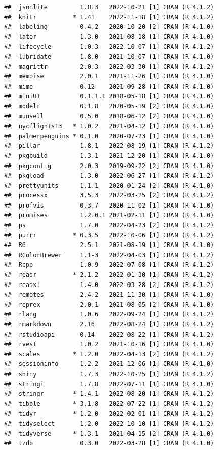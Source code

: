\documentclass[print]{nuthesis}
\begin{document}
\begin{verbatim}
##  jsonlite         1.8.3   2022-10-21 [1] CRAN (R 4.1.2)
##  knitr          * 1.41    2022-11-18 [1] CRAN (R 4.1.2)
##  labeling         0.4.2   2020-10-20 [2] CRAN (R 4.1.0)
##  later            1.3.0   2021-08-18 [1] CRAN (R 4.1.0)
##  lifecycle        1.0.3   2022-10-07 [1] CRAN (R 4.1.2)
##  lubridate        1.8.0   2021-10-07 [1] CRAN (R 4.1.0)
##  magrittr         2.0.3   2022-03-30 [1] CRAN (R 4.1.2)
##  memoise          2.0.1   2021-11-26 [1] CRAN (R 4.1.0)
##  mime             0.12    2021-09-28 [1] CRAN (R 4.1.0)
##  miniUI           0.1.1.1 2018-05-18 [1] CRAN (R 4.1.0)
##  modelr           0.1.8   2020-05-19 [2] CRAN (R 4.1.0)
##  munsell          0.5.0   2018-06-12 [2] CRAN (R 4.1.0)
##  nycflights13   * 1.0.2   2021-04-12 [1] CRAN (R 4.1.0)
##  palmerpenguins * 0.1.0   2020-07-23 [1] CRAN (R 4.1.0)
##  pillar           1.8.1   2022-08-19 [1] CRAN (R 4.1.2)
##  pkgbuild         1.3.1   2021-12-20 [1] CRAN (R 4.1.0)
##  pkgconfig        2.0.3   2019-09-22 [2] CRAN (R 4.1.0)
##  pkgload          1.3.0   2022-06-27 [1] CRAN (R 4.1.2)
##  prettyunits      1.1.1   2020-01-24 [2] CRAN (R 4.1.0)
##  processx         3.5.3   2022-03-25 [2] CRAN (R 4.1.2)
##  profvis          0.3.7   2020-11-02 [1] CRAN (R 4.1.0)
##  promises         1.2.0.1 2021-02-11 [1] CRAN (R 4.1.0)
##  ps               1.7.0   2022-04-23 [2] CRAN (R 4.1.2)
##  purrr          * 0.3.5   2022-10-06 [1] CRAN (R 4.1.2)
##  R6               2.5.1   2021-08-19 [1] CRAN (R 4.1.0)
##  RColorBrewer     1.1-3   2022-04-03 [1] CRAN (R 4.1.2)
##  Rcpp             1.0.9   2022-07-08 [1] CRAN (R 4.1.2)
##  readr          * 2.1.2   2022-01-30 [1] CRAN (R 4.1.2)
##  readxl           1.4.0   2022-03-28 [2] CRAN (R 4.1.2)
##  remotes          2.4.2   2021-11-30 [1] CRAN (R 4.1.0)
##  reprex           2.0.1   2021-08-05 [2] CRAN (R 4.1.0)
##  rlang            1.0.6   2022-09-24 [1] CRAN (R 4.1.2)
##  rmarkdown        2.16    2022-08-24 [1] CRAN (R 4.1.2)
##  rstudioapi       0.14    2022-08-22 [1] CRAN (R 4.1.2)
##  rvest            1.0.2   2021-10-16 [1] CRAN (R 4.1.0)
##  scales         * 1.2.0   2022-04-13 [2] CRAN (R 4.1.2)
##  sessioninfo      1.2.2   2021-12-06 [1] CRAN (R 4.1.0)
##  shiny            1.7.3   2022-10-25 [1] CRAN (R 4.1.2)
##  stringi          1.7.8   2022-07-11 [1] CRAN (R 4.1.0)
##  stringr        * 1.4.1   2022-08-20 [1] CRAN (R 4.1.2)
##  tibble         * 3.1.8   2022-07-22 [1] CRAN (R 4.1.2)
##  tidyr          * 1.2.0   2022-02-01 [1] CRAN (R 4.1.2)
##  tidyselect       1.2.0   2022-10-10 [1] CRAN (R 4.1.2)
##  tidyverse      * 1.3.1   2021-04-15 [2] CRAN (R 4.1.0)
##  tzdb             0.3.0   2022-03-28 [1] CRAN (R 4.1.0)

\end{verbatim}
\end{document}
